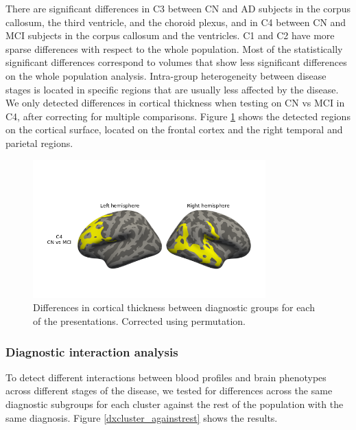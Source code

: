 There are significant differences in C3 between CN and AD subjects in the corpus callosum, the third ventricle, and the choroid plexus, and in C4 between CN and MCI subjects in the corpus callosum and the ventricles. C1 and C2 have more sparse differences with respect to the whole population. Most of the statistically significant differences correspond to volumes that show less significant differences on the whole population analysis. Intra-group heterogeneity between disease stages is located in specific regions that are usually less affected by the disease. \\

We only detected differences in cortical thickness when testing on CN vs MCI in C4, after correcting for multiple comparisons. Figure \ref{dx_subgroups_cort} shows the detected regions on the cortical surface, located on the frontal cortex and the right temporal and parietal regions. \\

\begin{figure}[!htbp]
\centering
\includegraphics[width=0.8\textwidth]{figures/cimlr/ex2_C4_CN_MCI.png}
\caption[Diagnostic group analysis, cortical thickness.]{Differences in cortical thickness between diagnostic groups for each of the presentations. Corrected using permutation.}
\label{dx_subgroups_cort}
\end{figure}

\subsubsection{Diagnostic interaction analysis}

To detect different interactions between blood profiles and brain phenotypes across different stages of the disease, we tested for differences across the same diagnostic subgroups for each cluster against the rest of the population with the same diagnosis. Figure \ref{dxcluster_againstrest} shows the results.

